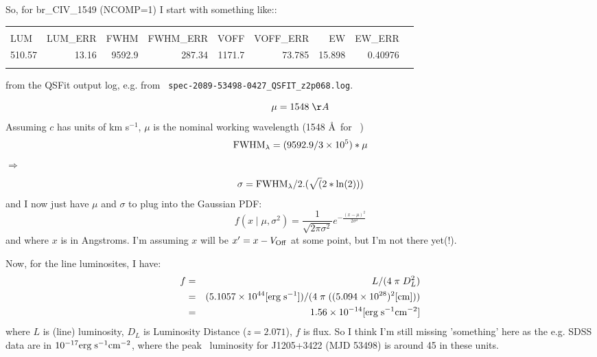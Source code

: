 \documentclass[11pt,a4paper]{article}
\newcommand{\qsfit}{{\sc QSFit}}
\begin{document}
\noindent
So, for br\_CIV\_1549 (NCOMP=1) I start with something like::
  \begin{center}
    \begin{tabular}{l   r    r   r  r  r  r  r  r    }
      \hline
                   & & & & & & &    \\
   LUM        & LUM\_ERR &  FWHM   & FWHM\_ERR   &   VOFF  & VOFF\_ERR  &    EW         &  EW\_ERR  \\
   510.57   &  13.16       & 9592.9  &  287.34         &   1171.7 &  73.785      &     15.898  & 0.40976    \\
                   & & & & & & &    \\
      \hline
\end{tabular}
\end{center}
from the \qsfit{} output log, e.g. from {\tt
spec-2089-53498-0427\_QSFIT\_z2p068.log}.


\begin{equation}
  \mu  = 1548 \; \AA
\end{equation}
Assuming $c$ has units of km s$^{-1}$, $\mu$ is the nominal working wavelength (1548 \AA\ for \civ\ )
\begin{equation}
    {\rm FWHM}_{\lambda}  = ( 9592.9  /3 \times 10^{5}) * \mu 
  \end{equation}
  $\Rightarrow$
\begin{equation}
  {\sigma}     =   {\rm FWHM}_{\lambda}  / 2. (\sqrt(2 * \ln(2)))
\end{equation}
and I now just have $\mu$ and $\sigma$ to plug into the Gaussian PDF: 
\begin{equation}
  f(x\mid \mu ,\sigma ^{2})={\frac {1}{\sqrt {2\pi \sigma ^{2}}}}e^{-{\frac {(x-\mu )^{2}}{2\sigma ^{2}}}}
\end{equation}
and where $x$ is in Angstroms.
I'm assuming $x$ will be $x' = x - V_{\rm Off}$ at some point, but I'm not there yet(!).

\vspace{16pt}
\noindent
Now, for the line luminosites, I have: 
\begin{eqnarray}
     f &  = &   L / (4 \; \pi   \;  D_{L}^{2})  \\
  &  = &   (5.1057 \times 10^{44} [{\rm erg  \;  s^{-1}}] ) /   (4 \; \pi \; ((5.094 \times 10^{28})^{2} [{\rm cm}])) \\
         & = & 1.56 \times 10^{-14}  [{\rm erg  \;  s^{-1} cm^{-2}} ]
\end{eqnarray}
where $L$ is (line) luminosity, $D_{L}$ is Luminosity Distance
($z=2.071$), $f$ is flux.  So I think I'm still missing 'something'
here as the e.g. SDSS data are in $10^{-17} {\rm erg \; s^{-1}
cm^{-2}}$, where the peak \civ\ luminosity for J1205+3422 (MJD 53498)
is around 45 in these units.
\end{document}
